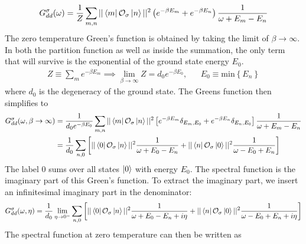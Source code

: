 \documentclass[prb]{revtex4-2}
\begin{document}
\begin{equation}\begin{aligned}
	G_{d d}^\sigma(\omega) = \frac{1}{Z}\sum_{m,n}||\bra{m}\mathcal{O}_{\sigma}\ket{n}||^2\left( e^{-\beta E_m} + e^{-\beta E_n}\right)\frac{1}{\omega + E_m - E_n}
\end{aligned}\end{equation}
The zero temperature Green's function is obtained by taking the limit of \(\beta \to \infty\). In both the partition function as well as inside the summation, the only term that will survive is the exponential of the ground state energy \(E_0\).
\begin{equation*}\begin{aligned}
	Z \equiv \sum_m e^{-\beta E_m} \implies \lim_{\beta \to \infty}Z = d_0 e^{-\beta E_0}, && E_0 \equiv \text{min}\left\{ E_n \right\} 
\end{aligned}\end{equation*}
where \(d_0\) is the degeneracy of the ground state. The Greens function then simplifies to
\begin{equation}\begin{aligned}
	\label{Gf_lk}
	G_{d d}^\sigma(\omega, \beta \to \infty) &= \frac{1}{d_0e^{-\beta E_0}}\sum_{m,n}||\bra{m}\mathcal{O}_{\sigma}\ket{n}||^2\left[e^{-\beta E_m}\delta_{E_m, E_0} + e^{-\beta E_n}\delta_{E_n, E_0}\right]\frac{1}{\omega + E_m - E_n}\\
						 &= \frac{1}{d_0}\sum_{n,0}\left[||\bra{0}\mathcal{O}_{\sigma}\ket{n}||^2\frac{1}{\omega + E_0 - E_n} + ||\bra{n}\mathcal{O}_{\sigma}\ket{0}||^2\frac{1}{\omega - E_0 + E_n}\right]\\
\end{aligned}\end{equation}
The label 0 sums over all states \(\ket{0}\) with energy \(E_0\). The spectral function is the imaginary part of this Green's function. To extract the imaginary part, we insert an infinitesimal imaginary part in the denominator:
\begin{equation}\begin{aligned}
	G_{d d}^\sigma(\omega, \eta) = \frac{1}{d_0}\lim_{\eta \to 0^-}\sum_{n,0}\left[||\bra{0}\mathcal{O}_{\sigma}\ket{n}||^2\frac{1}{\omega + E_0 - E_n + i\eta} + ||\bra{n}\mathcal{O}_{\sigma}\ket{0}||^2\frac{1}{\omega - E_0 + E_n + i\eta}\right]\\
\end{aligned}\end{equation}
The spectral function at zero temperature can then be written as
\end{document}
